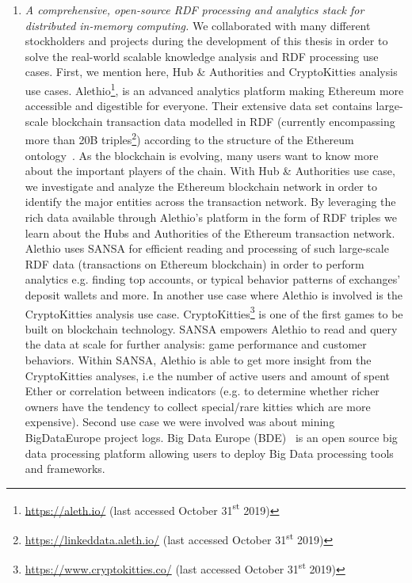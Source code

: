 \begin{enumerate}
    \item \textit{A comprehensive, open-source RDF processing and analytics stack for distributed in-memory computing.} 
    We collaborated with many different stockholders and projects during the development of this thesis in order to solve the real-world scalable knowledge analysis and \gls{RDF} processing use cases.
    First, we mention here, Hub \& Authorities and CryptoKitties analysis use cases. 
    Alethio\footnote{\scriptsize \url{https://aleth.io/} (last accessed October 31{\textsuperscript{st}} 2019)}, is an advanced analytics platform making Ethereum more accessible and digestible for everyone.
    Their extensive data set contains large-scale blockchain transaction data modelled in RDF (currently encompassing more than 20B triples\footnote{\scriptsize \url{https://linkeddata.aleth.io/} (last accessed October 31{\textsuperscript{st}} 2019)}) according to the structure of the Ethereum ontology~\cite{pfeffer2016ethon}.
    As the blockchain is evolving, many users want to know more about the important players of the chain. 
    With Hub \& Authorities use case, we investigate and analyze the Ethereum blockchain network in order to identify the major entities across the transaction network. 
    By leveraging the rich data available through Alethio's platform in the form of RDF triples we learn about the Hubs and Authorities of the Ethereum transaction network.
    Alethio uses SANSA for efficient reading and processing of such large-scale RDF data (transactions on Ethereum blockchain) in order to perform analytics e.g. finding top accounts, or typical behavior patterns of exchanges' deposit wallets and more.
    In another use case where Alethio is involved is the CryptoKitties analysis use case.
    CryptoKitties\footnote{\url{https://www.cryptokitties.co/} (last accessed October 31{\textsuperscript{st}} 2019)} is one of the first games to be built on blockchain technology.
    SANSA empowers Alethio to read and query the data at scale for further analysis: game performance and customer behaviors.
    Within SANSA, Alethio is able to get more insight from the CryptoKitties analyses, i.e the number of active users and amount of spent Ether or correlation between indicators (e.g. to determine whether richer owners have the tendency to collect special/rare kitties which are more expensive).
    Second use case we were involved was about mining BigDataEurope project logs.
    Big Data Europe (BDE)~\cite{Auer+ICWE-2017} is an open source big data processing platform allowing users to deploy Big Data processing tools and frameworks. 

\end{enumerate}
